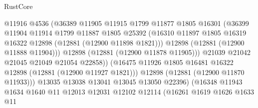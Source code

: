 \begin{lexlean}{RustCore}
\begin{coremodule}
                                  @11916
                                  @4536
                                  (@36389
                                    @11905
                                    @11915
                                    @1799
                                    @11877
                                    @1805
                                    @16301
                                    (@36399
                                      @11904
                                      @11914
                                      @1799
                                      @11887
                                      @1805
                                      @25392
                                      (@16310
                                        @11897
                                        @1805
                                        @16319
                                        @16322
                                        @12898
                                        (@12881 (@12900 @11898 @1821)))
                                      @12898
                                      (@12881 (@12900 @11888 @11904)))
                                    @12898
                                    (@12881 (@12900 @11878 @11905)))
                                  @21039
                                  @21042
                                  @21045
                                  @21049
                                  @21054
                                  @22858))
                              (@16475
                                @11926
                                @1805
                                @16481
                                @16322
                                @12898
                                (@12881 (@12900 @11927 @1821)))
                              @12898
                              (@12881 (@12900 @11870 @11933)))
                            @13035
                            @13038
                            @13041
                            @13045
                            @13050
                            @22396)
                          (@16348
                            @11943
                            @1634
                            @1640
                            @11
                            @12013
                            @12031
                            @12102
                            @12114
                            (@16261
                              @1619
                              @1626
                              @1633
                              @11

\end{coremodule}
\end{lexlean}
